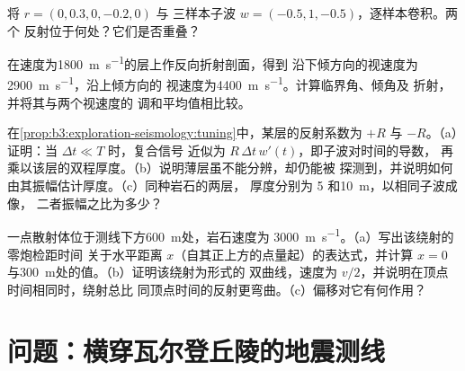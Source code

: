 \begin{exercise}[$\star\star$]\label{exo:b3:exploration-seismology:9}
将 $r = (0, 0.3, 0, -0.2, 0)$ 与
三样本子波 $w = (-0.5, 1, -0.5)$，逐样本卷积。两个
反射位于何处？它们是否重叠？
\end{exercise}

\begin{exercise}[$\star\star\star$]\label{exo:b3:exploration-seismology:10}
在速度为\qty{1800}{m.s^{-1}}的层上作反向折射剖面，得到
沿下倾方向的视速度为\qty{2900}{m.s^{-1}}，沿上倾方向的
视速度为\qty{4400}{m.s^{-1}}。计算临界角、倾角及
折射，并将其与两个视速度的
调和平均值相比较。
\end{exercise}

\begin{exercise}[$\star\star\star$]\label{exo:b3:exploration-seismology:11}
在\cref{prop:b3:exploration-seismology:tuning}中，某层的反射系数为
$+R$ 与 $-R$。（a）证明：当 $\Delta t \ll T$ 时，复合信号
近似为 $R\,\Delta t\,w'(t)$，即子波对时间的导数，
再乘以该层的双程厚度。（b）说明薄层虽不能分辨，却仍能被
探测到，并说明如何由其振幅估计厚度。（c）同种岩石的两层，
厚度分别为 5 和\qty{10}{m}，以相同子波成像，
二者振幅之比为多少？
\end{exercise}

\begin{exercise}[$\star\star\star$]\label{exo:b3:exploration-seismology:12}
一点散射体位于测线下方\qty{600}{m}处，岩石速度为
\qty{3000}{m.s^{-1}}。（a）写出该绕射的零炮检距时间
关于水平距离 $x$（自其正上方的点量起）的表达式，并计算 $x = 0$
与\qty{300}{m}处的值。（b）证明该绕射为形式的
双曲线，速度为 $v/2$，并说明在顶点时间相同时，绕射总比
同顶点时间的反射更弯曲。（c）偏移对它有何作用？
\end{exercise}

\section{问题：横穿瓦尔登丘陵的地震测线}

